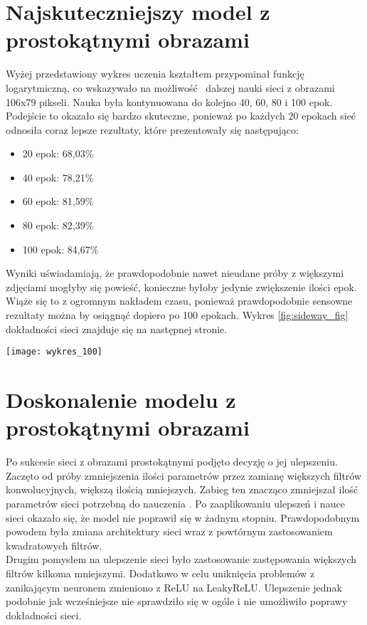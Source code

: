 \section{Najskuteczniejszy model z prostokątnymi obrazami}
Wyżej przedstawiony wykres uczenia kształtem przypominał funkcję logarytmiczną, co wskazywało na możliwość 
dalszej nauki sieci z obrazami 106x79 pikseli. Nauka była kontynuowana do kolejno 40, 60, 80 i 100 epok.\\
Podejście to okazało się bardzo skuteczne, ponieważ po każdych 20 epokach
sieć odnosiła coraz lepsze rezultaty, które prezentowały się następująco:\\
\begin{itemize}
\item  20 epok: 68,03\%\\
\item  40 epok: 78,21\%\\
\item  60 epok: 81,59\%\\
\item  80 epok: 82,39\%\\
\item  100 epok: 84,67\%\\
\end{itemize}
Wyniki uświadamiają, że prawdopodobnie nawet nieudane próby z większymi zdjęciami
mogłyby się powieść, konieczne byłoby jedynie zwiększenie ilości epok. Wiąże się to
z ogromnym nakładem czasu, ponieważ prawdopodobnie sensowne rezultaty można by osiągnąć
dopiero po 100 epokach. Wykres \ref{fig:sideway_fig} dokładności sieci znajduje się na następnej stronie.

\begin{sidewaysfigure}
\texttt{[image: wykres\_100]}
\caption{Wykres uczenia przez 100 epok}
\label{fig:sideway_fig}
\end{sidewaysfigure}

\section{Doskonalenie modelu z prostokątnymi obrazami}
Po sukcesie sieci z obrazami prostokątnymi podjęto decyzję o jej ulepszeniu.
Zaczęto od próby zmniejszenia ilości parametrów przez zamianę większych filtrów konwolucyjnych,
większą ilością mniejszych. Zabieg ten znacząco zmniejszał ilość parametrów sieci potrzebną do nauczenia \cite{substBigConv}.
Po zaaplikowaniu ulepszeń i nauce sieci okazało się, że model nie poprawił się w żadnym
stopniu. Prawdopodobnym powodem była zmiana architektury sieci wraz z powtórnym
zastosowaniem kwadratowych filtrów.\\
Drugim pomysłem na ulepszenie sieci było zastosowanie zastępowania większych filtrów
kilkoma mniejszymi. Dodatkowo w celu uniknięcia problemów z zanikającym neuronem zmieniono z ReLU na LeakyReLU.
Ulepszenie jednak podobnie jak wcześniejsze nie sprawdziło się w ogóle i nie umożliwiło poprawy dokładności sieci.
